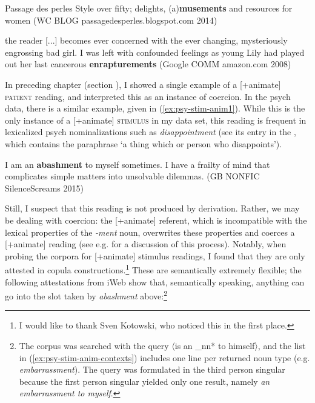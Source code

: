 \begin{exe}
	\ex \label{ex:stim/instr}
	\begin{xlist}
		\item \label{ex:stim/instr1} Passage des perles Style over fifty; delights, (a)\textbf{musements} and resources for women {\small(\acs{WC} BLOG passagedesperles.blogspot.com 2014)}
		\item \label{ex:stim/instr2} the reader [...] becomes ever concerned with the ever changing, mysteriously engrossing bad girl. I was left with confounded feelings as young Lily had played out her last cancerous \textbf{enrapturements} {\small (Google COMM amazon.com 2008)}
	\end{xlist}
\end{exe}

\noindent In preceding chapter (section ), I showed a single example of a \mbox{[+animate]} \textsc{patient} reading, and interpreted this as an instance of coercion. In the psych data, there is a similar example, given in (\ref{ex:psy-stim-anim1}). While this is the only instance of a [+animate] \textsc{stimulus} in my data set, this reading is frequent in lexicalized psych nominalizations such as \textit{disappointment} (see its entry in the , which contains the paraphrase `a thing which or person who disappoints'). 

\begin{exe}
	\ex \label{ex:psy-stim-anim1} 
	I am an \textbf{abashment} to myself sometimes. I have a frailty of mind that complicates simple matters into unsolvable dilemmas. {\small(\acs{GB} NONFIC SilenceScreams 2015)}
\end{exe}

\noindent Still, I suspect that this reading is not produced by derivation. Rather, we may be dealing with coercion: the [+animate] referent, which is incompatible with the lexical properties of the \textit{-ment} noun, overwrites these properties and coerces a [+animate] reading (see e.g. \citealt{Michaelis.2004} for a discussion of this process). Notably, when probing the corpora for [+animate] stimulus readings, I found that they are only attested in copula constructions.\footnote{I would like to thank Sven Kotowski, who noticed this in the first place.} These are semantically extremely flexible; the following attestations from \acs{iWeb} show that, semantically speaking, anything can go into the slot taken by \textit{abashment} above:\footnote{The corpus was searched with the query 〈is an \_nn* to himself〉, and the list in (\ref{ex:psy-stim-anim-contexts}) includes one line per returned noun type (e.g. \textit{embarrassment}). The query was formulated in the third person singular because the first person singular yielded only one result, namely \textit{an embarrassment to myself}.}

